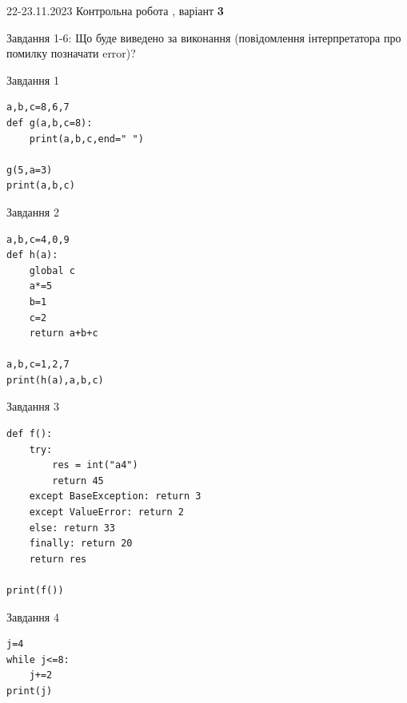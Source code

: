 \documentclass[12pt, ukrainian]{article}
\begin{document}
{{22-23.11.2023 Контрольна робота , варіант  \No \textbf { 3 }\par}}
{

Завдання 1-6: Що буде виведено за виконання (повідомлення інтерпретатора про помилку позначати error)?


\begin{minipage}[t]{9.7cm}                
{\begin{center}Завдання {1}\end{center}}
\begin{verbatim}
a,b,c=8,6,7
def g(a,b,c=8):
    print(a,b,c,end=" ")

g(5,a=3)
print(a,b,c)
\end{verbatim}     
\end{minipage}
\vline \hspace{8mm}
\begin{minipage}[t]{8.0cm}                
{\begin{center}Завдання {2}\end{center}}
\begin{verbatim}
a,b,c=4,0,9
def h(a):
    global c
    a*=5
    b=1
    c=2
    return a+b+c

a,b,c=1,2,7
print(h(a),a,b,c)
\end{verbatim}     
\end{minipage}

\vspace{15mm}
\begin{minipage}[t]{9.7cm}                
{\begin{center}Завдання {3}\end{center}}
\begin{verbatim}
def f():
    try:
        res = int("a4")
        return 45
    except BaseException: return 3
    except ValueError: return 2
    else: return 33
    finally: return 20
    return res

print(f())
\end{verbatim}     
\end{minipage}
\vline \hspace{8mm}
\begin{minipage}[t]{8.0cm}                
{\begin{center}Завдання {4}\end{center}}
\begin{verbatim}
j=4
while j<=8:
    j+=2
print(j)
\end{verbatim}     
\end{minipage}

}
\end{document}
